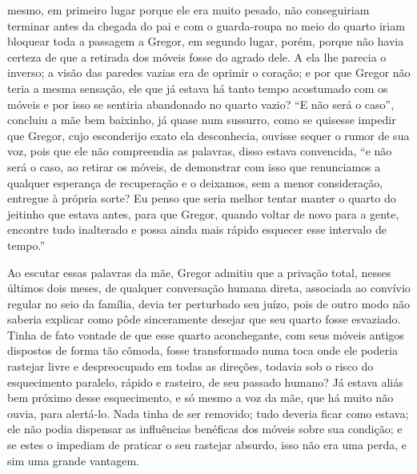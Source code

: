 mesmo, em primeiro lugar porque ele era muito pesado, não conseguiriam
terminar antes da chegada do pai e com o guarda-roupa no meio do quarto
iriam bloquear toda a passagem a Gregor, em segundo lugar, porém, porque
não havia certeza de que a retirada dos móveis fosse do agrado dele. A ela
lhe parecia o inverso; a visão das paredes vazias era de oprimir o
coração; e por que Gregor não teria a mesma sensação, ele que já estava há
tanto tempo acostumado com os móveis e por isso se sentiria abandonado no
quarto vazio? “E não será o caso”, concluiu a mãe bem baixinho, já quase
num sussurro, como se quisesse impedir que Gregor, cujo esconderijo exato
ela desconhecia, ouvisse sequer o rumor de sua voz, pois que ele não
compreendia as palavras, disso estava convencida, “e não será o caso, ao
retirar os móveis, de demonstrar com isso que renunciamos a qualquer
esperança de recuperação e o deixamos, sem a menor consideração, entregue
à própria sorte? Eu penso que seria melhor tentar manter o quarto do
jeitinho que estava antes, para que Gregor, quando voltar de novo para a
gente, encontre tudo inalterado e possa ainda mais rápido esquecer esse
intervalo de tempo.”

Ao escutar essas palavras da mãe, Gregor admitiu que a privação total,
nesses últimos dois meses, de qualquer conversação humana direta,
associada ao convívio regular no seio da família, devia ter perturbado seu
juízo, pois de outro modo não saberia explicar como pôde sinceramente
desejar que seu quarto fosse esvaziado. Tinha de fato vontade de que esse
quarto aconchegante, com seus móveis antigos dispostos de forma tão
cômoda, fosse transformado numa toca onde ele poderia rastejar livre e
despreocupado em todas as direções, todavia sob o risco do esquecimento
paralelo, rápido e rasteiro, de seu passado humano? Já estava aliás bem
próximo desse esquecimento, e só mesmo a voz da mãe, que há muito não
ouvia, para alertá-lo. Nada tinha de ser removido; tudo deveria ficar como
estava; ele não podia dispensar as influências benéficas dos móveis sobre
sua condição; e se estes o impediam de praticar o seu rastejar absurdo,
isso não era uma perda, e sim uma grande vantagem.


